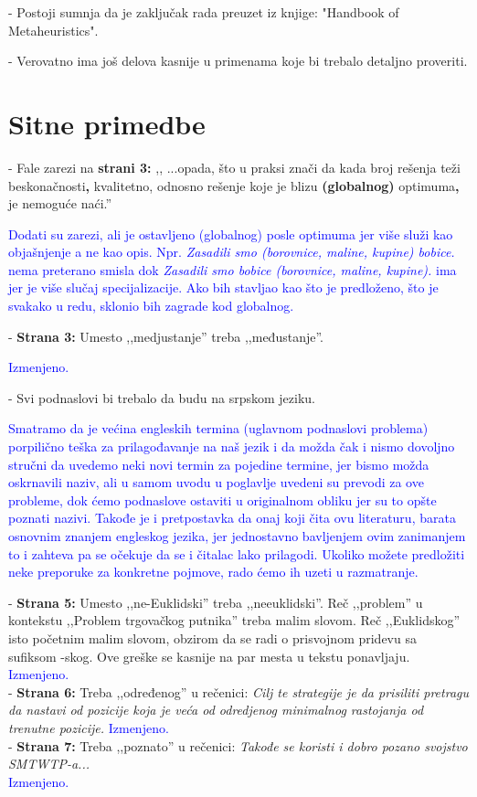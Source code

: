 \documentclass[a4paper]{report}
\newcommand{\odgovor}[1]{\textcolor{blue}{#1}}
\begin{document}
- Postoji sumnja da je zaključak rada preuzet iz knjige: "Handbook of Metaheuristics".

- Verovatno ima još delova kasnije u primenama koje bi trebalo detaljno proveriti.

\section{Sitne primedbe}
- Fale zarezi na \textbf{strani 3:} ,, ...opada, što u praksi znači da kada broj rešenja teži beskonačnosti\textbf{,} kvalitetno, odnosno rešenje koje
je blizu \textbf{(globalnog)} optimuma\textbf{,} je nemoguće naći.''

\odgovor{Dodati su zarezi, ali je ostavljeno (globalnog) posle optimuma jer više služi kao objašnjenje a ne kao opis. Npr. \textit{Zasadili smo (borovnice, maline, kupine) bobice.} nema preterano smisla dok 
\textit{Zasadili smo bobice (borovnice, maline, kupine).} ima jer je više slučaj specijalizacije. Ako bih stavljao kao što je predloženo, što je svakako u redu, sklonio bih zagrade kod globalnog.\\}

- \textbf{Strana 3:} Umesto ,,medjustanje'' treba ,,međustanje''.

\odgovor{Izmenjeno.\\}

- Svi podnaslovi bi trebalo da budu na srpskom jeziku.


\odgovor{Smatramo da je većina engleskih termina (uglavnom podnaslovi problema) porpilično teška za prilagođavanje na naš jezik i da možda čak i nismo dovoljno stručni da uvedemo neki novi termin za pojedine termine, jer bismo možda oskrnavili naziv, ali u samom uvodu u poglavlje uvedeni su prevodi za ove probleme, dok ćemo podnaslove ostaviti u originalnom obliku jer su to opšte poznati nazivi. Takođe je i pretpostavka da onaj koji čita ovu literaturu, barata osnovnim znanjem engleskog jezika, jer jednostavno bavljenjem ovim zanimanjem to i zahteva pa se očekuje da se i čitalac lako prilagodi. Ukoliko možete predložiti neke preporuke za konkretne pojmove, rado ćemo ih uzeti u razmatranje.\\}

- \textbf{Strana 5:} Umesto ,,ne-Euklidski'' treba ,,neeuklidski''. Reč ,,problem'' u kontekstu ,,Problem trgovačkog putnika'' treba malim slovom. Reč ,,Euklidskog'' isto početnim malim slovom, obzirom da se radi o prisvojnom pridevu sa sufiksom -skog. Ove greške se kasnije na par mesta u tekstu ponavljaju.
\odgovor{Izmenjeno.\\}
- \textbf{Strana 6:} Treba ,,određenog'' u rečenici: {\em Cilj te strategije je da prisiliti pretragu da nastavi od pozicije koja je veća od odredjenog minimalnog rastojanja od trenutne pozicije.}
\odgovor{Izmenjeno.\\}
- \textbf{Strana 7:} Treba ,,poznato'' u rečenici: {\em Takođe se koristi i dobro pozano svojstvo SMTWTP-a...}\\
\odgovor{Izmenjeno.\\}
\end{document}
